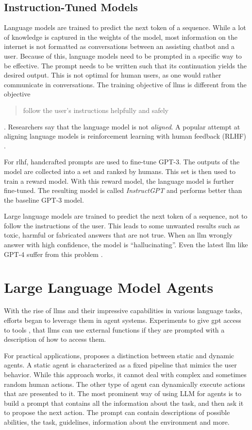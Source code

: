 \documentclass[../main.tex]{subfiles}
\begin{document}
\subsection{Instruction-Tuned Models}

Language models are trained to predict the next token of a sequence.
While a lot of knowledge is captured in the weights of the model,
most information on the internet is not formatted as conversations
between an assisting chatbot and a user.
Because of this, language models need to be prompted in a specific way to be effective.
The prompt needs to be written such that its continuation yields the desired output.
This is not optimal for human users, as one would rather communicate in conversations.
The training objective of \glspl{llm} is different from the objective
\blockquote{follow the user's instructions helpfully and safely} \cite{Ouyang2022}.
Researchers say that the language model is not \emph{aligned}.
A popular attempt at aligning language models is reinforcement learning with human feedback (RLHF) \cite{Ouyang2022}.

For \gls{rlhf}, handcrafted prompts are used to fine-tune GPT-3.
The outputs of the model are collected into a set and ranked by humans.
This set is then used to train a reward model.
With this reward model, the language model is further fine-tuned.
The resulting model is called \emph{InstructGPT} and performs better than the baseline GPT-3 model.

Large language models are trained to predict the next token of a sequence,
not to follow the instructions of the user.
This leads to some unwanted results such as toxic, harmful or fabricated answers that are not true.
When an \gls{llm} wrongly answer with high confidence, the model is ``hallucinating''.
Even the latest \gls{llm} like GPT-4 suffer from this problem \cite{OpenAI2024}.

\section{Large Language Model Agents}
\label{sec:llm_agents}

With the rise of \glspl{llm} and their impressive capabilities in various language tasks,
efforts began to leverage them in agent systems.
Experiments to give \gls{gpt} access to tools \autocite{Shen2023, Schick2023},
that \glspl{llm} can use external functions
if they are prompted with a description of how to access them.

For practical applications, \autocite{Zhu2024} proposes a distinction between static and dynamic agents.
A static agent is characterized as a fixed pipeline that mimics the user behavior.
While this approach works,
it cannot deal with complex and sometimes random human actions.
The other type of agent can dynamically execute actions that are presented to it.
The most prominent way of using LLM for agents
is to build a prompt that contains all the information about the task,
and then ask it to propose the next action.
The prompt can contain descriptions of possible abilities, the task, guidelines,
information about the environment and more.
\end{document}
